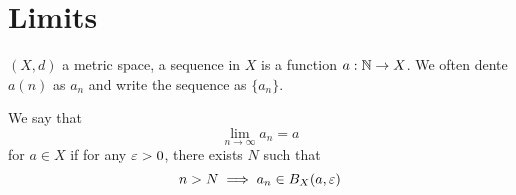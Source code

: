 \chapter{Limits}

\begin{definition}
  $(X, d)$ a metric space, a sequence in $X$ is a function $a : \mathbb N \to X$.
  We often dente $a(n)$ as $a_n$ and write the sequence as $\{a_n\}$.
\end{definition}

\begin{definition}
  We say that 
  \[
    \lim\limits_{n \to \infty} a_n = a
    \]
  for $a \in X$ if for any $\varepsilon > 0$, there exists $N$ such that 
  \[n > N \implies a_n \in B_X(a, \varepsilon)\]
\end{definition}
